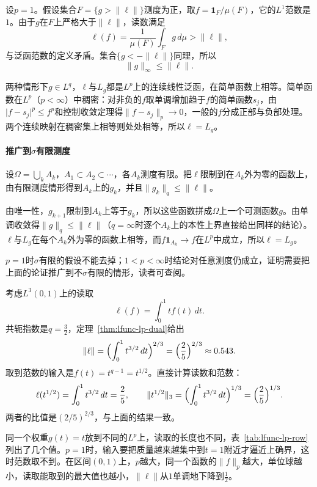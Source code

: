 设$p=1$。假设集合$F=\{g>\lVert\ell\rVert\}$测度为正，取$f=\mathbf{1}_F/\mu(F)$，它的$L^1$范数是$1$。由于$g$在$F$上严格大于$\lVert\ell\rVert$，读数满足
\[
\ell(f)=\frac{1}{\mu(F)}\int_Fg\,d\mu>\lVert\ell\rVert ,
\]
与泛函范数的定义矛盾。集合$\{g<-\lVert\ell\rVert\}$同理，所以
\[
\lVert g\rVert_\infty\leq\lVert\ell\rVert .
\]

两种情形下$g\in L^q$，$\ell$与$L_g$都是$L^p$上的连续线性泛函，在简单函数上相等。简单函数在$L^p$（$p<\infty$）中稠密：对非负的$f$取单调增加趋于$f$的简单函数$s_j$，由$\lvert f-s_j\rvert^p\leq f^p$和控制收敛定理得$\lVert f-s_j\rVert_p\to0$，一般的$f$分成正部与负部处理。两个连续映射在稠密集上相等则处处相等，所以$\ell=L_g$。

\paragraph{推广到\texorpdfstring{$\sigma$}{sigma}有限测度}
设$\Omega=\bigcup_kA_k$，$A_1\subset A_2\subset\cdots$，各$A_k$测度有限。把$\ell$限制到在$A_k$外为零的函数上，由有限测度情形得到$A_k$上的$g_k$，并且$\lVert g_k\rVert_q\leq\lVert\ell\rVert$。

由唯一性，$g_{k+1}$限制到$A_k$上等于$g_k$，所以这些函数拼成$\Omega$上一个可测函数$g$。由单调收敛得$\lVert g\rVert_q\leq\lVert\ell\rVert$（$q=\infty$时逐个$A_k$上的本性上界直接给出同样的结论）。$\ell$与$L_g$在每个$A_k$外为零的函数上相等，而$f\mathbf{1}_{A_k}\to f$在$L^p$中成立，所以$\ell=L_g$。

$p=1$时$\sigma$有限的假设不能去掉；$1<p<\infty$时结论对任意测度仍成立，证明需要把上面的论证推广到不$\sigma$有限的情形，读者可查阅。

\begin{example}[一个可复算的对偶范数]
\label{ex:lfunc-l3-norm}
考虑$L^3(0,1)$上的读取
\[
\ell(f)=\int_0^1tf(t)\,dt .
\]
共轭指数是$q=\tfrac32$，定理~\ref{thm:lfunc-lp-dual}给出
\[
\lVert\ell\rVert=\Bigl(\int_0^1t^{3/2}\,dt\Bigr)^{2/3}=\Bigl(\frac25\Bigr)^{2/3}\approx0.543 .
\]
取到范数的输入是$f(t)=t^{q-1}=t^{1/2}$。直接计算读数和范数：
\[
\ell(t^{1/2})=\int_0^1t^{3/2}\,dt=\frac25,\qquad
\lVert t^{1/2}\rVert_3=\Bigl(\int_0^1t^{3/2}\,dt\Bigr)^{1/3}=\Bigl(\frac25\Bigr)^{1/3}.
\]
两者的比值是$(2/5)^{2/3}$，与上面的结果一致。
\end{example}

同一个权重$g(t)=t$放到不同的$L^p$上，读取的长度也不同，表~\ref{tab:lfunc-lp-row}列出了几个值。$p=1$时，输入要把质量越来越集中到$t=1$附近才逼近上确界，这时范数取不到。在区间$(0,1)$上，$p$越大，同一个函数的$\lVert f\rVert_p$越大，单位球越小，读取能取到的最大值也越小，$\lVert\ell\rVert$从$1$单调地下降到$\tfrac12$。

